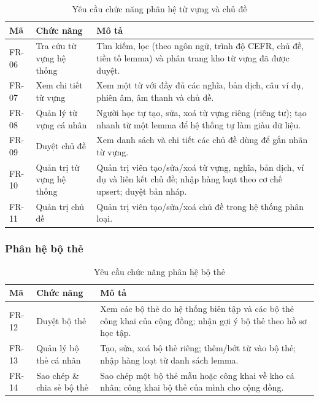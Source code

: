\begin{table}[h]
  \centering
  \small
  \renewcommand{\arraystretch}{1.3}
  \begin{tabular}{|p{1.7cm}|p{3.4cm}|p{9.4cm}|}
    \hline
    \textbf{Mã} & \textbf{Chức năng} & \textbf{Mô tả} \\
    \hline
    FR-06 & Tra cứu từ vựng hệ thống & Tìm kiếm, lọc (theo ngôn ngữ, trình độ CEFR, chủ đề, tiền tố lemma) và phân trang kho từ vựng đã được duyệt. \\
    \hline
    FR-07 & Xem chi tiết từ vựng & Xem một từ với đầy đủ các nghĩa, bản dịch, câu ví dụ, phiên âm, âm thanh và chủ đề. \\
    \hline
    FR-08 & Quản lý từ vựng cá nhân & Người học tự tạo, sửa, xoá từ vựng riêng (riêng tư); tạo nhanh từ một lemma để hệ thống tự làm giàu dữ liệu. \\
    \hline
    FR-09 & Duyệt chủ đề & Xem danh sách và chi tiết các chủ đề dùng để gắn nhãn từ vựng. \\
    \hline
    FR-10 & Quản trị từ vựng hệ thống & Quản trị viên tạo/sửa/xoá từ vựng, nghĩa, bản dịch, ví dụ và liên kết chủ đề; nhập hàng loạt theo cơ chế upsert; duyệt bản nháp. \\
    \hline
    FR-11 & Quản trị chủ đề & Quản trị viên tạo/sửa/xoá chủ đề trong hệ thống phân loại. \\
    \hline
  \end{tabular}
  \caption{Yêu cầu chức năng phân hệ từ vựng và chủ đề}
  \label{tab:fr-vocab}
\end{table}

\subsubsection{Phân hệ bộ thẻ}

\begin{table}[h]
  \centering
  \small
  \renewcommand{\arraystretch}{1.3}
  \begin{tabular}{|p{1.7cm}|p{3.4cm}|p{9.4cm}|}
    \hline
    \textbf{Mã} & \textbf{Chức năng} & \textbf{Mô tả} \\
    \hline
    FR-12 & Duyệt bộ thẻ & Xem các bộ thẻ do hệ thống biên tập và các bộ thẻ công khai của cộng đồng; nhận gợi ý bộ thẻ theo hồ sơ học tập. \\
    \hline
    FR-13 & Quản lý bộ thẻ cá nhân & Tạo, sửa, xoá bộ thẻ riêng; thêm/bớt từ vào bộ thẻ; nhập hàng loạt từ danh sách lemma. \\
    \hline
    FR-14 & Sao chép \& chia sẻ bộ thẻ & Sao chép một bộ thẻ mẫu hoặc công khai về kho cá nhân; công khai bộ thẻ của mình cho cộng đồng. \\
    \hline
  \end{tabular}
  \caption{Yêu cầu chức năng phân hệ bộ thẻ}
  \label{tab:fr-deck}
\end{table}

